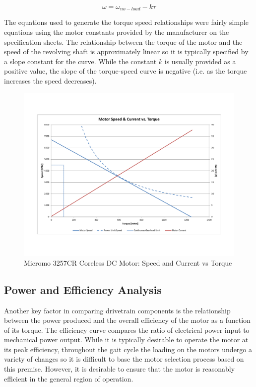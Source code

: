 \begin{equation}
	\omega = \omega_{no-load} - k\tau
\end{equation}

The equations used to generate the torque speed relationships were fairly simple equations using the motor constants provided by the manufacturer on the specification sheets. The relationship between the torque of the motor and the speed of the revolving shaft is approximately linear so it is typically specified by a slope constant for the curve. While the constant $k$ is usually provided as a positive value, the slope of the torque-speed curve is negative (i.e. as the torque increases the speed decreases). 

\begin{figure}[!ht]
	\begin{center}
    \includegraphics[scale=0.6]{fig/ch5/motor1.pdf}
	\end{center}
  \caption{Micromo 3257CR Coreless DC Motor: Speed and Current vs Torque}
\end{figure}


\subsection{Power and Efficiency Analysis} %
\label{sub:power_and_efficiency_analysis}
Another key factor in comparing drivetrain components is the relationship between the power produced and the overall efficiency of the motor as a function of its torque. The efficiency curve compares the ratio of electrical power input to mechanical power output. While it is typically desirable to operate the motor at its peak efficiency, throughout the gait cycle the loading on the motors undergo a variety of changes so it is difficult to base the motor selection process based on this premise. However, it is desirable to ensure that the motor is reasonably efficient in the general region of operation. 


